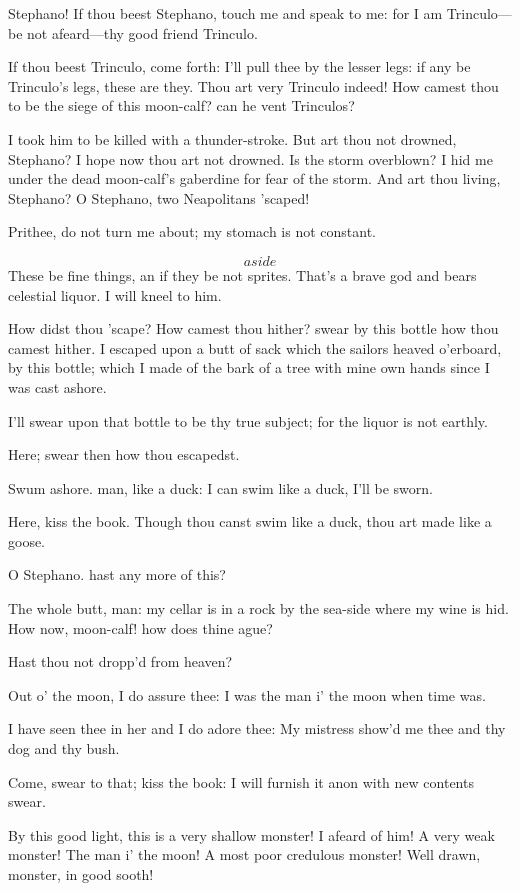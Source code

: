 \documentclass[11pt]{book}
\begin{document}
\begin{PROSE}
	Stephano! If thou beest Stephano, touch me and
	speak to me: for I am Trinculo---be not afeard---thy
	good friend Trinculo.

	If thou beest Trinculo, come forth: I'll pull thee
	by the lesser legs: if any be Trinculo's legs,
	these are they. Thou art very Trinculo indeed! How
	camest thou to be the siege of this moon-calf? can
	he vent Trinculos?

	I took him to be killed with a thunder-stroke. But
	art thou not drowned, Stephano? I hope now thou art
	not drowned. Is the storm overblown? I hid me
	under the dead moon-calf's gaberdine for fear of
	the storm. And art thou living, Stephano? O
	Stephano, two Neapolitans 'scaped!

	Prithee, do not turn me about; my stomach is not constant.

\5	\[aside\]  These be fine things, an if they be
	not sprites.
	That's a brave god and bears celestial liquor.
	I will kneel to him.

	How didst thou 'scape? How camest thou hither?
	swear by this bottle how thou camest hither. I
	escaped upon a butt of sack which the sailors
	heaved o'erboard, by this bottle; which I made of
	the bark of a tree with mine own hands since I was
	cast ashore.

\5	I'll swear upon that bottle to be thy true subject;
	for the liquor is not earthly.

	Here; swear then how thou escapedst.

	Swum ashore. man, like a duck: I can swim like a
	duck, I'll be sworn.

	Here, kiss the book. Though thou canst swim like a
	duck, thou art made like a goose.

	O Stephano. hast any more of this?

	The whole butt, man: my cellar is in a rock by the
	sea-side where my wine is hid. How now, moon-calf!
	how does thine ague?

\5	Hast thou not dropp'd from heaven?

	Out o' the moon, I do assure thee: I was the man i'
	the moon when time was.

\5	I have seen thee in her and I do adore thee:
	My mistress show'd me thee and thy dog and thy bush.

	Come, swear to that; kiss the book: I will furnish
	it anon with new contents swear.

	By this good light, this is a very shallow monster!
	I afeard of him! A very weak monster! The man i'
	the moon! A most poor credulous monster! Well
	drawn, monster, in good sooth!


\end{PROSE}
\end{document}
